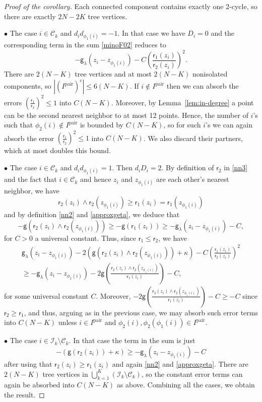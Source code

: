 \documentclass[a4paper,10pt,leqno]{amsart}
\numberwithin{equation}{section}
\def\g{\mathsf{g}}
\def\rr{\mathsf{r}}
\def\pair{\mathrm{pair}}
\begin{document}
\begin{proof}[Proof of the corollary]
  Each connected component contains exactly one $2$-cycle, so there are exactly $2N-2K$ tree vertices.

  $\bullet$ The case $i\in \mathcal C_k$ and $d_id_{\phi_1(i)}=-1$. In that case we have $D_i=0$ and the corresponding term in the sum \eqref{minoF02} reduces to
  \[- \g_\lambda(z_i-z_{\phi_1(i)}) - C \left( \frac{\rr_1(z_i)}{\rr_2(z_i)}\right)^2 .\] There are $2(N-K)$ tree vertices and at most $2(N-K)$ nonisolated components, so $|(I^\pair)^c|\le6(N-K)$. If $i\notin I^{\pair}$ then we can absorb the errors $(\frac{\rr_1}{\rr_2})^2\le 1$ into $C(N-K)$. Moreover, by Lemma~\ref{lem:in-degree} a point can be the second nearest neighbor to at most 12 points. Hence, the number of $i$'s such that $\phi_2(i) \notin I^\pair$ is bounded by $C(N-K)$, so for such $i$'s we can again absorb the error $(\frac{\rr_1}{\rr_2})^2\le 1$ into $C(N-K)$. We also discard their partners, which at most doubles this bound.

  $\bullet$ The case $i\in \mathcal C_k$ and $d_i d_{\phi_1(i)}=1$. Then $d_i D_i= 2$. By definition of $\rr_2$ in \eqref{nn3} and the fact that $i\in \mathcal C_k$ and hence $z_i$ and $z_{\phi_1(i)}$ are each other's nearest neighbor,
  we have \[\rr_2(z_i) \wedge \rr_2(z_{\phi_1(i)})\ge \rr_1(z_i)=\rr_1(z_{\phi_1(i)}) \] and by definition \eqref{nn2} and \eqref{approxgeta}, we deduce that
  \begin{equation*}
    -\g(\rr_2(z_i)\wedge \rr_2(z_{\phi_1(i)} ) )\ge -\g(\rr_1(z_i) )\ge -\g_\lambda(z_i-z_{\phi_1(i)}) -C,
  \end{equation*}
  for $C>0$ a universal constant. Thus, since $\rr_1\le \rr_2$, we have
  \begin{multline*}\g_\lambda(z_i-z_{\phi_1(i)} ) -2 \left( \g\left( \rr_2(z_i) \wedge \rr_2(z_{\phi_1(i)} ) \right)+\kappa\right)- C \left(\frac{\rr_1(z_i)}{\rr_2(z_i)}\right)^2
    \\
    \ge - \g_\lambda(z_i-z_{\phi_1(i)} ) - 2\g\left(\frac{\rr_2(z_i) \wedge \rr_2(z_{\phi_1(i)})}{\rr_1(z_i)}\right) - C,\end{multline*} for some universal constant $C$.
  Moreover, $- 2\g\left(\frac{\rr_2(z_i) \wedge \rr_2(z_{\phi_1(i)})}{\rr_1(z_i)}\right) - C\ge - C$ since $\rr_2\ge \rr_1$, and thus,
  arguing as in the previous case, we may absorb such error terms into $C(N-K)$ unless $i\in I^\pair$ and $\phi_2(i),\phi_2(\phi_1(i))\in I^\pair$.

  $\bullet$ The case $i\in\mathcal I_k\setminus\mathcal C_k$. In that case the term in the sum is just
  \[-\left(\g(\rr_2(z_i)) +\kappa \right)\ge - \g_\lambda(z_i-z_{\phi_1(i)}) -C
  \] after using that $\rr_2(z_i) \ge \rr_1(z_i)$ and again \eqref{nn2} and \eqref{approxgeta}. There are $2(N-K)$ tree vertices in $\bigcup_{k=1}^K(\mathcal I_k\setminus\mathcal C_k)$, so the constant error terms can again be absorbed into $C(N-K)$ as above.
  Combining all the cases, we obtain the result.
\end{proof}
\end{document}
